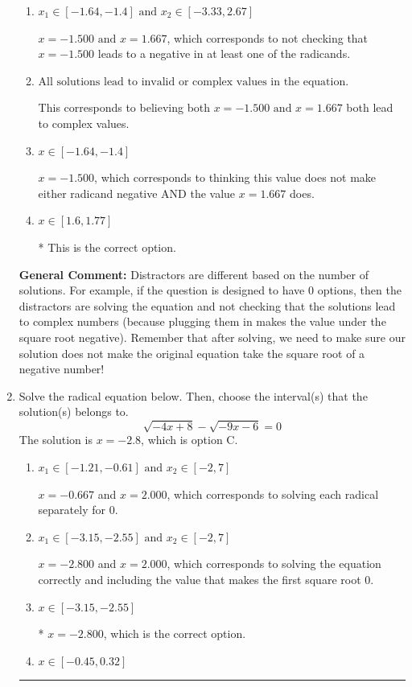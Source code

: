 \documentclass{extbook}[14pt]
\newcommand{\litem}[1]{\item #1

\rule{\textwidth}{0.4pt}}
\begin{document}
\begin{enumerate}
{\begin{enumerate}[label=\Alph*.]
$x = 1.500 \text{ and } x = 1.667$, which corresponds to negatives or the absolute value of the values you would have gotten by solving the equation correctly.
\item \( x_1 \in [-1.64, -1.4] \text{ and } x_2 \in [-3.33,2.67] \)

$x = -1.500 \text{ and } x = 1.667$, which corresponds to not checking that $x = -1.500$ leads to a negative in at least one of the radicands.
\item \( \text{All solutions lead to invalid or complex values in the equation.} \)

This corresponds to believing both $x = -1.500 \text{ and } x = 1.667$ both lead to complex values.
\item \( x \in [-1.64,-1.4] \)

$x = -1.500$, which corresponds to thinking this value does not make either radicand negative AND the value $x = 1.667$ does.
\item \( x \in [1.6,1.77] \)

* This is the correct option.
\end{enumerate}

\textbf{General Comment:} Distractors are different based on the number of solutions. For example, if the question is designed to have 0 options, then the distractors are solving the equation and not checking that the solutions lead to complex numbers (because plugging them in makes the value under the square root negative). Remember that after solving, we need to make sure our solution does not make the original equation take the square root of a negative number!
}
\litem{
Solve the radical equation below. Then, choose the interval(s) that the solution(s) belongs to.
\[ \sqrt{-4 x + 8} - \sqrt{-9 x - 6} = 0 \]The solution is \( x = -2.8 \), which is option C.\begin{enumerate}[label=\Alph*.]
\item \( x_1 \in [-1.21, -0.61] \text{ and } x_2 \in [-2,7] \)

$x = -0.667$ and $x = 2.000$, which corresponds to solving each radical separately for 0.
\item \( x_1 \in [-3.15, -2.55] \text{ and } x_2 \in [-2,7] \)

$x = -2.800$ and $x = 2.000$, which corresponds to solving the equation correctly and including the value that makes the first square root 0.
\item \( x \in [-3.15,-2.55] \)

* $x = -2.800$, which is the correct option.
\item \( x \in [-0.45,0.32] \)


\end{enumerate}}
\end{enumerate}
\end{document}
